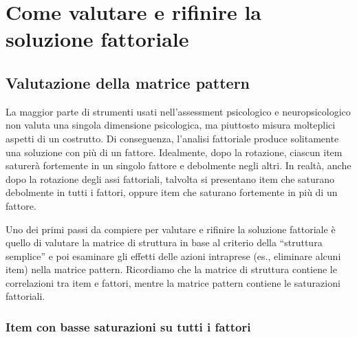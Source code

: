 \chapter{Come valutare e rifinire la soluzione fattoriale}
\label{ch:val_sol_fattoriale}


\section{Valutazione della matrice pattern}

La maggior parte di strumenti usati nell'assessment psicologico e neuropsicologico non valuta una singola dimensione psicologica, ma piuttosto misura molteplici aspetti di un costrutto. Di conseguenza, l'analisi fattoriale produce solitamente una soluzione con più di un fattore. Idealmente, dopo la rotazione, ciascun item saturerà fortemente in un singolo fattore e debolmente negli altri. In realtà, anche dopo la rotazione degli assi fattoriali, talvolta si presentano item che saturano debolmente in tutti i fattori, oppure item che saturano fortemente in più di un fattore.

Uno dei primi passi da compiere per valutare e rifinire la soluzione fattoriale è quello di valutare la matrice di struttura in base al criterio della ``struttura semplice'' e poi esaminare gli effetti delle azioni intraprese (es., eliminare alcuni item) nella matrice pattern. Ricordiamo che la matrice di struttura contiene le correlazioni tra item e fattori, mentre la matrice pattern contiene le saturazioni fattoriali. 

\subsection{Item con basse saturazioni su tutti i fattori}

